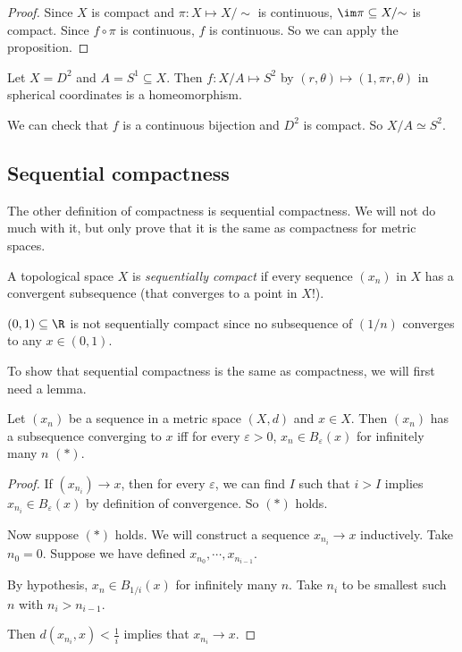 \documentclass[a4paper]{article}
\begin{document}
\begin{proof}
  Since $X$ is compact and $\pi: X\mapsto X/{\sim}$ is continuous, $\im \pi \subseteq X/{\sim}$ is compact. Since $f\circ \pi$ is continuous, $f$ is continuous. So we can apply the proposition.
\end{proof}

\begin{eg}
  Let $X = D^2$ and $A = S^1 \subseteq X$. Then $f: X/A \mapsto S^2$ by $(r, \theta) \mapsto (1, \pi r, \theta)$ in spherical coordinates is a homeomorphism.

  We can check that $f$ is a continuous bijection and $D^2$ is compact. So $X/A \simeq S^2$.
\end{eg}

\subsection{Sequential compactness}
The other definition of compactness is sequential compactness. We will not do much with it, but only prove that it is the same as compactness for metric spaces.

\begin{defi}
  A topological space $X$ is \emph{sequentially compact} if every sequence $(x_n)$ in $X$ has a convergent subsequence (that converges to a point in $X$!).
\end{defi}

\begin{eg}
  $(0, 1) \subseteq \R$ is not sequentially compact since no subsequence of $(1/n)$ converges to any $x\in (0, 1)$.
\end{eg}

To show that sequential compactness is the same as compactness, we will first need a lemma.
\begin{lemma}
  Let $(x_n)$ be a sequence in a metric space $(X, d)$ and $x\in X$. Then $(x_n)$ has a subsequence converging to $x$ iff for every $\varepsilon > 0$, $x_n \in B_\varepsilon (x)$ for infinitely many $n$ $(*)$.
\end{lemma}

\begin{proof}
  If $(x_{n_i}) \to x$, then for every $\varepsilon$, we can find $I$ such that $i > I$ implies $x_{n_i}\in B_\varepsilon (x)$ by definition of convergence. So $(*)$ holds.

  Now suppose $(*)$ holds. We will construct a sequence $x_{n_i} \to x$ inductively. Take $n_0 = 0$. Suppose we have defined $x_{n_0}, \cdots, x_{n_{i - 1}}$.

  By hypothesis, $x_n \in B_{1/i}(x)$ for infinitely many $n$. Take $n_i$ to be smallest such $n$ with $n_i > n_{i - 1}$.

  Then $d(x_{n_i}, x) < \frac{1}{i}$ implies that $x_{n_i} \to x$.
\end{proof}
\end{document}
